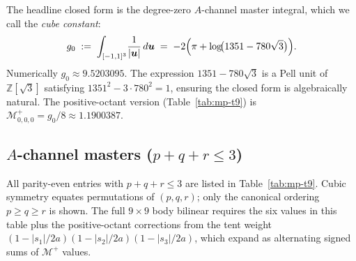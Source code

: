 \documentclass[11pt,a4paper]{article}
\newcommand{\bu}{\bm{u}}
\theoremstyle{plain}
\theoremstyle{definition}
\theoremstyle{remark}
\begin{document}
The headline closed form is the degree-zero $A$-channel master integral,
which we call the \emph{cube constant}:
\begin{equation}
  g_0 \;:=\; \int_{[-1,1]^3}\!\frac{1}{|\bu|}\,d\bu
  \;=\; -2\Bigl(\pi + \log\!\bigl(1351 - 780\sqrt{3}\bigr)\Bigr).
  \label{eq:g0}
\end{equation}
Numerically $g_0 \approx 9.5203095$.  The expression
$1351 - 780\sqrt{3}$ is a Pell unit of $\mathbb{Z}[\sqrt{3}]$
satisfying $1351^2 - 3\cdot 780^2 = 1$, ensuring the closed form is
algebraically natural.  The positive-octant version (Table~\ref{tab:mp-t9})
is $\mathcal{M}^+_{0,0,0} = g_0/8 \approx 1.1900387$.

\subsection*{$A$-channel masters ($p+q+r \le 3$)}

All parity-even entries with $p+q+r \le 3$ are listed in
Table~\ref{tab:mp-t9}.  Cubic symmetry equates permutations of
$(p,q,r)$; only the canonical ordering $p \ge q \ge r$ is shown.  The
full $9\times9$ body bilinear requires the six values in this table plus
the positive-octant corrections from the tent weight
$(1-|s_1|/2a)(1-|s_2|/2a)(1-|s_3|/2a)$, which expand as alternating
signed sums of $\mathcal{M}^+$ values.
\end{document}
